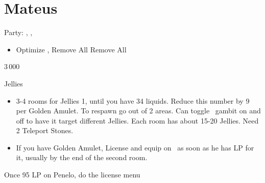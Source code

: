 \chapter{Mateus}
\begin{menu}
	Party: \vaan, \ashe, \penelo
\end{menu}
\begin{equip}
	\begin{itemize}
		\vaanf Remove Mythril Blade, Escutcheon
		\item Optimize \ashe, \penelo
		      \baschf Remove All
		      \balthierf Remove All
	\end{itemize}
\end{equip}
\begin{shop}{3\,000}
\end{shop}
\begin{gambit}
	\begin{itemize}
	\end{itemize}
\end{gambit}
\begin{battle}{Jellies}
	\begin{itemize}
		\item 3-4 rooms for Jellies 1, until you have 34 liquids. Reduce this number by 9 per Golden Amulet. To respawn go out of 2 areas. Can toggle \ashe\ gambit on and off to have it target different Jellies. Each room has about 15-20 Jellies. Need 2 Teleport Stones.
		\item If you have Golden Amulet, License and equip on \vaan\ as soon as he has LP for it, usually by the end of the second room.
	\end{itemize}
\end{battle}
\begin{liscense}
	Once 95 LP on Penelo, do the license menu
	\begin{itemize}
	\end{itemize}
\end{liscense}
